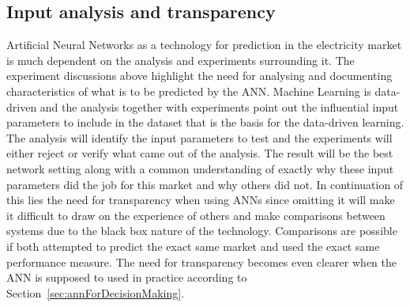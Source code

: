 \subsection{Input analysis and transparency}
Artificial Neural Networks as a technology for prediction in the electricity market is much dependent on the analysis and experiments surrounding it. The experiment discussions above highlight the need for analysing and documenting characteristics of what is to be predicted by the ANN. Machine Learning is data-driven\cite{18} and the analysis together with experiments point out the influential input parameters to include in the dataset that is the basis for the data-driven learning. The analysis will identify the input parameters to test and the experiments will either reject or verify what came out of the analysis. The result will be the best network setting along with a common understanding of exactly why these input parameters did the job for this market and why others did not. In continuation of this lies the need for transparency when using ANNs since omitting it will make it difficult to draw on the experience of others and make comparisons between systems due to the black box nature of the technology. Comparisons are possible if both attempted to predict the exact same market and used the exact same performance measure. The need for transparency becomes even clearer when the ANN is supposed to used in practice according to Section~\ref{sec:annForDecisionMaking}. 


